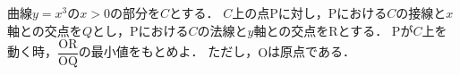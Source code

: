 \documentclass[../../main.tex]{subfiles}
\begin{document}
曲線$y=x^3$の$x>0$の部分を$C$とする．
$C$上の点$\mathrm{P}$に対し，$\mathrm{P}$における$C$の接線と$x$軸との交点を$Q$とし，$\mathrm{P}$における$C$の法線と$y$軸との交点を$\mathrm{R}$とする．
$\mathrm{P}$が$C$上を動く時，$\dfrac{\mathrm{OR}}{\mathrm{OQ}}$の最小値をもとめよ．
ただし，$\mathrm{O}$は原点である．
\end{document}
